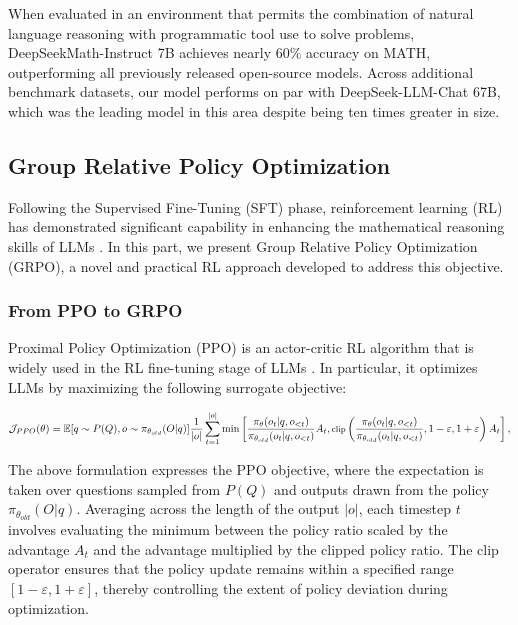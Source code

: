 \begin{itemize}[topsep=0pt]
\begin{itemize}[topsep=0pt]
When evaluated in an environment that permits the combination of natural language reasoning with programmatic tool use to solve problems, DeepSeekMath-Instruct 7B achieves nearly 60\% accuracy on MATH, outperforming all previously released open-source models. Across additional benchmark datasets, our model performs on par with DeepSeek-LLM-Chat 67B, which was the leading model in this area despite being ten times greater in size.

\subsection{Group Relative Policy Optimization} Following the Supervised Fine-Tuning (SFT) phase, reinforcement learning (RL) has demonstrated significant capability in enhancing the mathematical reasoning skills of LLMs \citep{wang2023math,wizardmath}. In this part, we present Group Relative Policy Optimization (GRPO), a novel and practical RL approach developed to address this objective.

\subsubsection{From PPO to GRPO} Proximal Policy Optimization (PPO) \citep{schulman2017proximal} is an actor-critic RL algorithm that is widely used in the RL fine-tuning stage of LLMs \citep{ouyang2022training}. In particular, it optimizes LLMs by maximizing the following surrogate objective:

\begin{equation}
\footnotesize
    \mathcal{J}_{PPO}(\theta) = \mathbb{E}{[q \sim P(Q), o \sim \pi_{\theta_{old}}(O|q)]} \frac{1}{|o|} \sum_{t=1}^{|o|} \min \left[ \frac{\pi_\theta(o_{t} | q, o_{<t})}{\pi_{\theta_{old}}(o_{t} | q, o_{<t})} A_{t}, \text{clip} \left( \frac{\pi_\theta(o_{t} | q, o_{<t})}{\pi_{\theta_{old}}(o_{t} | q, o_{<t})}, 1 - \varepsilon, 1 + \varepsilon \right)  A_{t} \right] ,
\end{equation}

The above formulation expresses the PPO objective, where the expectation is taken over questions sampled from $P(Q)$ and outputs drawn from the policy $\pi_{\theta_{old}}(O|q)$. Averaging across the length of the output $|o|$, each timestep $t$ involves evaluating the minimum between the policy ratio scaled by the advantage $A_t$ and the advantage multiplied by the clipped policy ratio. The clip operator ensures that the policy update remains within a specified range $[1 - \varepsilon, 1 + \varepsilon]$, thereby controlling the extent of policy deviation during optimization.


\end{itemize}
\end{itemize}
